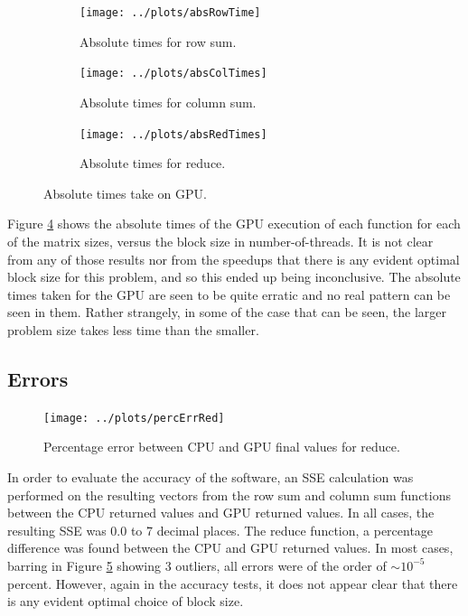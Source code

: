 \documentclass[12pt]{article}
\begin{document}
    \begin{figure}
        \centering
        \begin{subfigure}{0.32\textwidth}
            \centering
            \texttt{[image: ../plots/absRowTime]}
            \caption{Absolute times for row sum.}
            \label{fig:rowabs}
        \end{subfigure}
        \begin{subfigure}{0.32\textwidth}
            \centering
            \texttt{[image: ../plots/absColTimes]}
            \caption{Absolute times for column sum.}
            \label{fig:colabs}
        \end{subfigure}
        \begin{subfigure}{0.32\textwidth}
            \centering
            \texttt{[image: ../plots/absRedTimes]}
            \caption{Absolute times for reduce.}
            \label{fig:redabs}
        \end{subfigure}
        \caption{Absolute times take on GPU.}
        \label{fig:abs}
    \end{figure}
    Figure \ref{fig:abs} shows the absolute times of the GPU execution of each function for each of the matrix sizes, versus the block size in number-of-threads. It is not clear from any of those results nor from the speedups that there is any evident optimal block size for this problem, and so this ended up being inconclusive. The absolute times taken for the GPU are seen to be quite erratic and no real pattern can be seen in them. Rather strangely, in some of the case that can be seen, the larger problem size takes less time than the smaller.  

\subsection*{Errors}
    \begin{figure}
        \centering
         \texttt{[image: ../plots/percErrRed]}
         \caption{Percentage error between CPU and GPU final values for reduce.}
         \label{fig:err}
    \end{figure}
    In order to evaluate the accuracy of the software, an SSE calculation was performed on the resulting vectors from the row sum and column sum functions between the CPU returned values and GPU returned values. In all cases, the resulting SSE was $0.0$ to 7 decimal places. The reduce function, a percentage difference was found between the CPU and GPU returned values. In most cases, barring in Figure \ref{fig:err} showing 3 outliers, all errors were of the order of $\sim10^{-5}$ percent. However, again in the accuracy tests, it does not appear clear that there is any evident optimal choice of block size.
\end{document}
